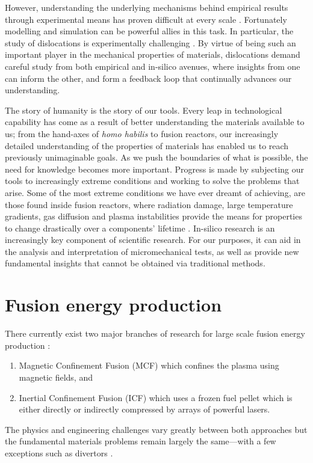However, understanding the underlying mechanisms behind empirical results through experimental means has proven difficult at every scale \cite{multiscale_model_mats1, multiscale_model_mats2}. Fortunately modelling and simulation can be powerful allies in this task. In particular, the study of dislocations is experimentally challenging \cite{dln_exp_obs1, dln_exp_obs2, dln_exp_obs3}. By virtue of being such an important player in the mechanical properties of materials, dislocations demand careful study from both empirical and in-silico avenues, where insights from one can inform the other, and form a feedback loop that continually advances our understanding.

The story of humanity is the story of our tools. Every leap in technological capability has come as a result of better understanding the materials available to us; from the hand-axes of \textit{homo habilis} to fusion reactors, our increasingly detailed understanding of the properties of materials has enabled us to reach previously unimaginable goals. As we push the boundaries of what is possible, the need for knowledge becomes more important. Progress is made by subjecting our tools to increasingly extreme conditions and working to solve the problems that arise. Some of the most extreme conditions we have ever dreamt of achieving, are those found inside fusion reactors, where radiation damage, large temperature gradients, gas diffusion and plasma instabilities provide the means for properties to change drastically over a components' lifetime \cite{fusmat1, mats_fusion1, mats_fusion2}. In-silico research is an increasingly key component of scientific research. For our purposes, it can aid in the analysis and interpretation of micromechanical tests, as well as provide new fundamental insights that cannot be obtained via traditional methods.

\section{Fusion energy production}
\label{s:fusion}

There currently exist two major branches of research for large scale fusion energy production \cite{icfvsmcf,betti2010thermonuclear}:
\begin{enumerate}
  \item Magnetic Confinement Fusion (MCF) \cite{mcf} which confines the plasma using magnetic fields, and
  \item Inertial Confinement Fusion (ICF) \cite{icf} which uses a frozen fuel pellet which is either directly or indirectly compressed by arrays of powerful lasers.
\end{enumerate}
The physics and engineering challenges vary greatly between both approaches but the fundamental materials problems remain largely the same---with a few exceptions such as divertors \cite{icf_mcf1, icf_mcf2}.

